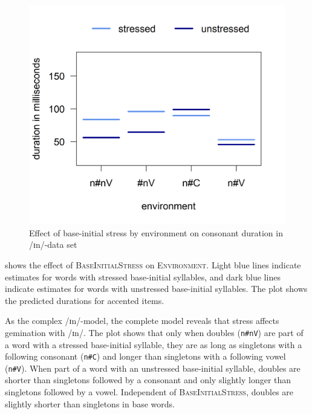 	\begin{figure}[b!]
		\centering
				\vspace*{-0.35cm}
		\includegraphics [scale=0.5] {images/Experiment/InModelCompleteInterEnvStress}
		
		\caption{Effect of base-initial stress by environment on consonant duration in /ɪn/-data set}	
		\label{fig:Env Stress In complete experiment}
	\end{figure}%








 shows the effect of \textsc{BaseInitialStress} on \textsc{Environment}. Light blue lines indicate estimates for words with stressed base-initial syllables, and dark blue lines indicate estimates for words with unstressed base-initial syllables. The plot shows the predicted durations for accented items.



As the complex /ɪn/-model, the complete model reveals that stress affects gemination with /ɪn/. 
The plot shows that only when doubles (\texttt{n\#nV}) are part of a word with a stressed base-initial syllable, they are as long as singletons with a following consonant  (\texttt{n\#C}) and longer than singletons with a following vowel  (\texttt{n\#V}). When part of a word with an unstressed base-initial syllable, doubles are shorter than singletons followed by a consonant and only slightly longer than singletons followed by a vowel. Independent of \textsc{BaseInitialStress}, doubles are slightly shorter than singletons in base words.




